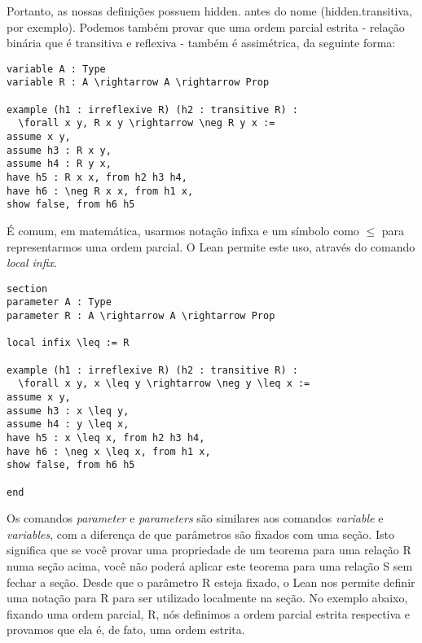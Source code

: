 Portanto, as nossas definições possuem hidden. antes do nome (hidden.transitiva, por exemplo).
Podemos também provar que uma ordem parcial estrita - relação binária que é transitiva e reflexiva - também é assimétrica, da seguinte forma:
\begin{lstlisting}
variable A : Type
variable R : A \rightarrow A \rightarrow Prop

example (h1 : irreflexive R) (h2 : transitive R) :
  \forall x y, R x y \rightarrow \neg R y x :=
assume x y,
assume h3 : R x y,
assume h4 : R y x,
have h5 : R x x, from h2 h3 h4,
have h6 : \neg R x x, from h1 x,
show false, from h6 h5
\end{lstlisting}
É comum, em matemática, usarmos notação infixa e um símbolo como $\leq$ para representarmos uma ordem parcial.
O Lean permite este uso, através do comando \textit{local infix}. 
\begin{lstlisting}
section
parameter A : Type
parameter R : A \rightarrow A \rightarrow Prop

local infix \leq := R

example (h1 : irreflexive R) (h2 : transitive R) :
  \forall x y, x \leq y \rightarrow \neg y \leq x :=
assume x y,
assume h3 : x \leq y,
assume h4 : y \leq x,
have h5 : x \leq x, from h2 h3 h4,
have h6 : \neg x \leq x, from h1 x,
show false, from h6 h5

end
\end{lstlisting}
Os comandos \textit{parameter} e \textit{parameters} são similares aos comandos \textit{variable} e \textit{variables}, com a diferença de que parâmetros são fixados com uma seção.
Isto significa que se você provar uma propriedade de um teorema para uma relação R numa seção acima, você não poderá aplicar este teorema para uma relação S sem fechar a seção. Desde que o parâmetro R esteja fixado, o Lean nos permite definir uma notação para R para ser utilizado localmente na seção.
No exemplo abaixo, fixando uma ordem parcial, R, nós definimos a ordem parcial estrita respectiva e provamos que ela é, de fato, uma ordem estrita.
